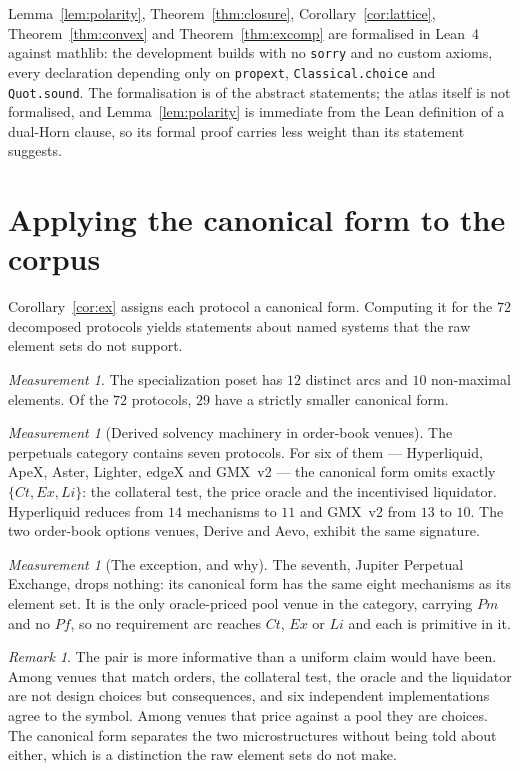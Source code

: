\documentclass[11pt]{article}
\theoremstyle{definition}
\theoremstyle{plain}
\theoremstyle{remark}
\newtheorem{measurement}[definition]{Measurement}
\newtheorem{remark}[definition]{Remark}
\begin{document}
Lemma~\ref{lem:polarity}, Theorem~\ref{thm:closure}, Corollary~\ref{cor:lattice},
Theorem~\ref{thm:convex} and Theorem~\ref{thm:excomp} are formalised in Lean~4
against mathlib: the development builds with no \texttt{sorry} and no custom
axioms, every declaration depending only on \texttt{propext},
\texttt{Classical.choice} and \texttt{Quot.sound}. The formalisation is of the
abstract statements; the atlas itself is not formalised, and
Lemma~\ref{lem:polarity} is immediate from the Lean definition of a dual-Horn
clause, so its formal proof carries less weight than its statement suggests.

\section{Applying the canonical form to the corpus}\label{sec:apply}

Corollary~\ref{cor:ex} assigns each protocol a canonical form. Computing it for
the $72$ decomposed protocols yields statements about named systems that the raw
element sets do not support.

\begin{measurement}\label{meas:compress}
The specialization poset has $12$ distinct arcs and $10$ non-maximal elements. Of
the $72$ protocols, $29$ have a strictly smaller canonical form.
\end{measurement}

\begin{measurement}[Derived solvency machinery in order-book venues]\label{prop:perps}
The perpetuals category contains seven protocols. For six of them --- Hyperliquid,
ApeX, Aster, Lighter, edgeX and GMX~v2 --- the canonical form omits exactly
$\{Ct, Ex, Li\}$: the collateral test, the price oracle and the incentivised
liquidator. Hyperliquid reduces from $14$ mechanisms to $11$ and GMX~v2 from $13$
to $10$. The two order-book options venues, Derive and Aevo, exhibit the same
signature.
\end{measurement}

\begin{measurement}[The exception, and why]\label{meas:jupiter}
The seventh, Jupiter Perpetual Exchange, drops nothing: its canonical form has
the same eight mechanisms as its element set. It is the only oracle-priced pool
venue in the category, carrying $Pm$ and no $Pf$, so no requirement arc reaches
$Ct$, $Ex$ or $Li$ and each is primitive in it.
\end{measurement}

\begin{remark}
The pair is more informative than a uniform claim would have been. Among venues
that match orders, the collateral test, the oracle and the liquidator are not
design choices but consequences, and six independent implementations agree to the
symbol. Among venues that price against a pool they are choices. The canonical
form separates the two microstructures without being told about either, which is
a distinction the raw element sets do not make.
\end{remark}
\end{document}
